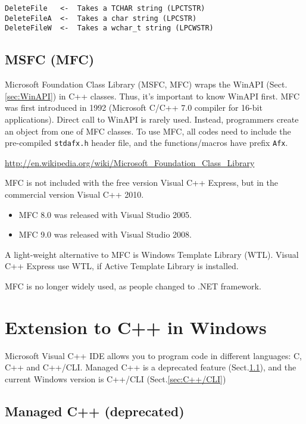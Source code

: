 \begin{verbatim}
DeleteFile   <-  Takes a TCHAR string (LPCTSTR)
DeleteFileA  <-  Takes a char string (LPCSTR)
DeleteFileW  <-  Takes a wchar_t string (LPCWSTR)
\end{verbatim}



\subsection{MSFC (MFC)}
\label{sec:MFC}

Microsoft Foundation Class Library (MSFC, MFC) wraps the WinAPI
(Sect.\ref{sec:WinAPI}) in C++ classes.
Thus, it's important to know WinAPI first.
MFC was first introduced in 1992 (Microsoft C/C++ 7.0 compiler for 16-bit
applications). Direct call to WinAPI is rarely used. Instead, programmers
create an object from one of MFC classes. To use MFC, all codes need to include
the pre-compiled \verb!stdafx.h! header file, and the functions/macros have
prefix \verb!Afx!.

\url{http://en.wikipedia.org/wiki/Microsoft_Foundation_Class_Library}

MFC is not included with the free version Visual C++ Express, but in the
commercial version Visual C++ 2010.
\begin{itemize}
  \item MFC 8.0 was released with Visual Studio 2005.

  \item MFC 9.0  was released with Visual Studio 2008. 
\end{itemize}
A light-weight alternative to MFC is Windows Template Library (WTL). Visual C++
Express use WTL, if Active Template Library is installed.

MFC is no longer widely used, as people changed to .NET framework.
 
\section{Extension to C++ in Windows}
\label{sec:VC++_Windows}

Microsoft Visual C++ IDE allows you to program code in different
languages: C, C++ and C++/CLI. Managed C++ is a deprecated feature
(Sect.\ref{sec:managed_C++}), and the current Windows version is C++/CLI
(Sect.\ref{sec:C++/CLI})

\subsection{Managed C++	 (deprecated)}
\label{sec:managed_C++}

